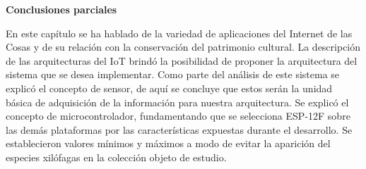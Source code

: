     \textbf{\large Conclusiones parciales}

    En este capítulo se ha hablado de la variedad de aplicaciones del Internet de las Cosas y de su relación con la conservación del patrimonio cultural. La descripción de las arquitecturas del IoT brindó la posibilidad de proponer la arquitectura del sistema que se desea implementar. Como parte del análisis de este sistema se explicó el concepto de sensor, de aquí se concluye que estos serán la unidad básica de adquisición de la información para nuestra arquitectura.
    Se explicó el concepto de microcontrolador, fundamentando que se selecciona ESP-12F sobre las demás plataformas por las características expuestas durante el desarrollo. 
    Se establecieron valores mínimos y máximos a modo de evitar la aparición del especies xilófagas en la colección objeto de estudio.